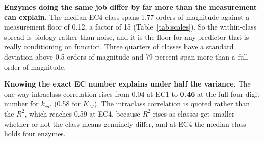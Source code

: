 \textbf{Enzymes doing the same job differ by far more than the measurement can explain.}
The median EC4 class spans 1.77 orders of magnitude against a measurement floor of 0.12, a
factor of 15 (Table~\ref{tab:scales}). So
the within-class spread is biology rather than noise, and it is the floor for any predictor
that is really conditioning on function. Three quarters of classes have a standard
deviation above 0.5 orders of magnitude and 79 percent span more than a full order of magnitude.

\textbf{Knowing the exact EC number explains under half the variance.} The one-way
intraclass correlation rises from 0.04 at EC1 to \textbf{0.46} at the full four-digit
number for $k_{cat}$ (0.58 for $K_M$). The intraclass correlation is quoted rather than the
$R^2$, which reaches 0.59 at EC4, because $R^2$ rises as classes get smaller whether or not
the class means genuinely differ, and at EC4 the median class holds four enzymes.

